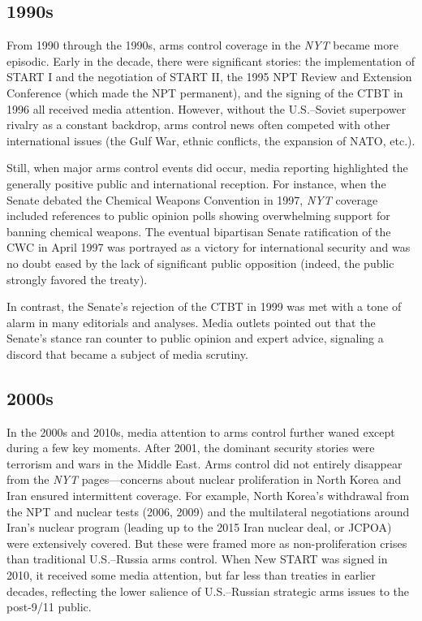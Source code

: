\documentclass[11,5 pt]{article}
\begin{document}
    
\subsection*{1990s}

    From 1990 through the 1990s, arms control coverage in the \textit{NYT} became more episodic. Early in the decade, there were significant stories: the implementation of START I and the negotiation of START II, the 1995 NPT Review and Extension Conference (which made the NPT permanent), and the signing of the CTBT in 1996 all received media attention. However, without the U.S.–Soviet superpower rivalry as a constant backdrop, arms control news often competed with other international issues (the Gulf War, ethnic conflicts, the expansion of NATO, etc.). 
    
    Still, when major arms control events did occur, media reporting highlighted the generally positive public and international reception. For instance, when the Senate debated the Chemical Weapons Convention in 1997, \textit{NYT} coverage included references to public opinion polls showing overwhelming support for banning chemical weapons. The eventual bipartisan Senate ratification of the CWC in April 1997 was portrayed as a victory for international security and was no doubt eased by the lack of significant public opposition (indeed, the public strongly favored the treaty). 
    
    In contrast, the Senate’s rejection of the CTBT in 1999 was met with a tone of alarm in many editorials and analyses. Media outlets pointed out that the Senate’s stance ran counter to public opinion and expert advice, signaling a discord that became a subject of media scrutiny.
    

\subsection*{2000s}

    In the 2000s and 2010s, media attention to arms control further waned except during a few key moments. After 2001, the dominant security stories were terrorism and wars in the Middle East. Arms control did not entirely disappear from the \textit{NYT} pages—concerns about nuclear proliferation in North Korea and Iran ensured intermittent coverage. For example, North Korea’s withdrawal from the NPT and nuclear tests (2006, 2009) and the multilateral negotiations around Iran’s nuclear program (leading up to the 2015 Iran nuclear deal, or JCPOA) were extensively covered. But these were framed more as non-proliferation crises than traditional U.S.–Russia arms control. When New START was signed in 2010, it received some media attention, but far less than treaties in earlier decades, reflecting the lower salience of U.S.–Russian strategic arms issues to the post-9/11 public. 
    
\end{document}
